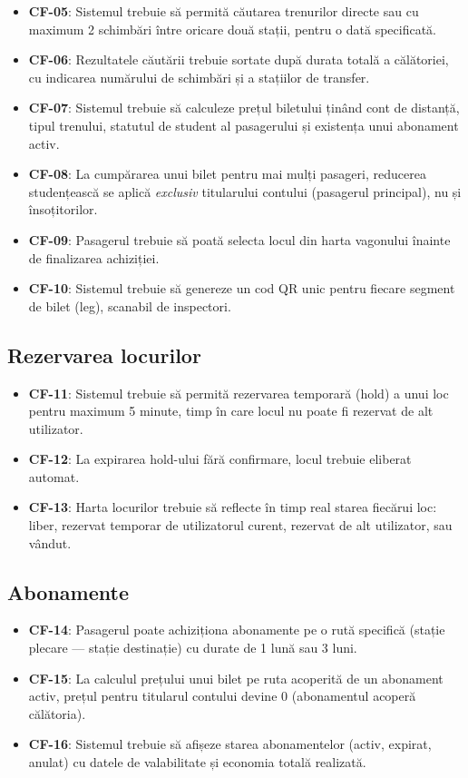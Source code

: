 \documentclass[12pt,a4paper]{report}
\begin{document}
\begin{itemize}
  \item \textbf{CF-05}: Sistemul trebuie să permită căutarea trenurilor directe sau cu maximum 2 schimbări între oricare două stații, pentru o dată specificată.
  \item \textbf{CF-06}: Rezultatele căutării trebuie sortate după durata totală a călătoriei, cu indicarea numărului de schimbări și a stațiilor de transfer.
  \item \textbf{CF-07}: Sistemul trebuie să calculeze prețul biletului ținând cont de distanță, tipul trenului, statutul de student al pasagerului și existența unui abonament activ.
  \item \textbf{CF-08}: La cumpărarea unui bilet pentru mai mulți pasageri, reducerea studențească se aplică \textit{exclusiv} titularului contului (pasagerul principal), nu și însoțitorilor.
  \item \textbf{CF-09}: Pasagerul trebuie să poată selecta locul din harta vagonului înainte de finalizarea achiziției.
  \item \textbf{CF-10}: Sistemul trebuie să genereze un cod QR unic pentru fiecare segment de bilet (leg), scanabil de inspectori.
\end{itemize}

\subsection{Rezervarea locurilor}

\begin{itemize}
  \item \textbf{CF-11}: Sistemul trebuie să permită rezervarea temporară (hold) a unui loc pentru maximum 5 minute, timp în care locul nu poate fi rezervat de alt utilizator.
  \item \textbf{CF-12}: La expirarea hold-ului fără confirmare, locul trebuie eliberat automat.
  \item \textbf{CF-13}: Harta locurilor trebuie să reflecte în timp real starea fiecărui loc: liber, rezervat temporar de utilizatorul curent, rezervat de alt utilizator, sau vândut.
\end{itemize}

\subsection{Abonamente}

\begin{itemize}
  \item \textbf{CF-14}: Pasagerul poate achiziționa abonamente pe o rută specifică (stație plecare — stație destinație) cu durate de 1 lună sau 3 luni.
  \item \textbf{CF-15}: La calculul prețului unui bilet pe ruta acoperită de un abonament activ, prețul pentru titularul contului devine 0 (abonamentul acoperă călătoria).
  \item \textbf{CF-16}: Sistemul trebuie să afișeze starea abonamentelor (activ, expirat, anulat) cu datele de valabilitate și economia totală realizată.
\end{itemize}
\end{document}
